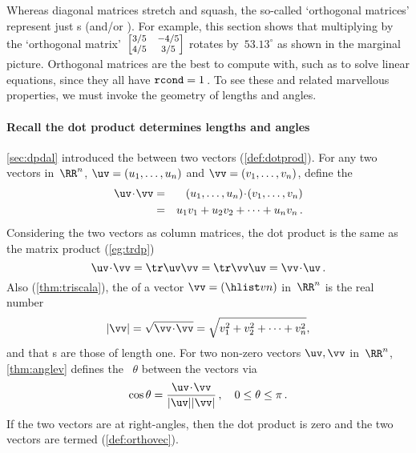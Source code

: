 Whereas diagonal matrices stretch and squash, the so-called 
`orthogonal matrices' represent just s (and/or ).
%
For example, this section shows that multiplying by the `orthogonal matrix'~\(\footnotesize\begin{bmatrix} 3/5&-4/5\\4/5&3/5 \end{bmatrix}\) rotates by~\(53.13^\circ\) as shown in the marginal picture.
Orthogonal matrices are the best to compute with, such as to solve linear equations, since they all have \(\verb|rcond|=1\)\,.
To see these and related marvellous properties, we must invoke the geometry of lengths and angles.


\paragraph{Recall the dot product determines lengths and angles}
\autoref{sec:dpdal} introduced the  between two vectors (\autoref{def:dotprod}).
For any two vectors in~\(\RR^n\), $\uv=(u_1,\ldots,u_n)$ and $\vv=(v_1,\ldots,v_n)$,
define the  
\begin{eqnarray*}
\uv\cdot \vv&=&(u_1,\ldots,u_n)\cdot (v_1,\ldots,v_n)
\\&=& u_1v_1+u_2v_2+\cdots+u_nv_n\,.
\end{eqnarray*}
Considering the two vectors as column matrices, the dot product is the same as the matrix product (\autoref{eg:trdp})
\begin{equation*}
\uv\cdot\vv=\tr\uv\vv=\tr\vv\uv=\vv\cdot\uv\,.
\end{equation*}
Also (\autoref{thm:triscala}), the  of a vector \(\vv=(\hlist vn)\) in~\(\RR^n\) is the real number  
\begin{equation*}
|\vv|=\sqrt{\vv\cdot\vv}=\sqrt{v_1^2+v_2^2+\cdots+v_n^2},
\end{equation*}
and that s are those of length one.
For two non-zero vectors \(\uv,\vv\) in~\(\RR^n\), \autoref{thm:anglev} defines the ~\(\theta\) between the vectors via 
\begin{equation*}
\cos\theta=\frac{\uv\cdot\vv}{|\uv||\vv|}\,,
\quad 0\leq\theta\leq\pi\,.
\end{equation*}
If the two vectors are at right-angles, then the dot product is zero and the two vectors are termed  (\autoref{def:orthovec}).









